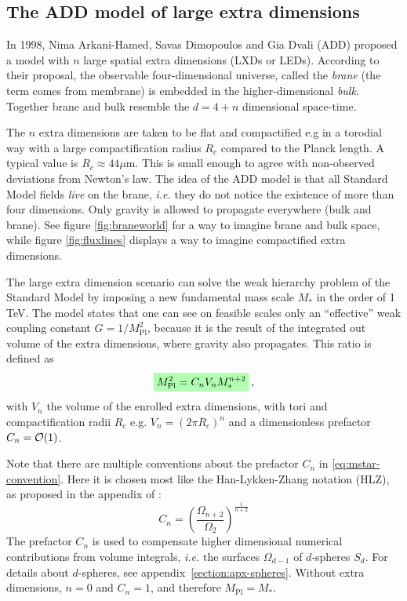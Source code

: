 \documentclass[12pt,a4paper]{report}
\numberwithin{equation}{chapter}
\newcommand{\highlight}[1]{%
  \colorbox{green!30}{$\displaystyle#1$}}
\begin{document}
\subsection{The ADD model of large extra dimensions}
In 1998, Nima Arkani-Hamed, Savas Dimopoulos and Gia Dvali (ADD) proposed a model with $n$ large spatial extra dimensions (LXDs or LEDs). According to their proposal, the observable four-dimensional universe, called the \emph{brane} (the term comes from membrane) is embedded in the higher-dimensional \emph{bulk}. Together brane and bulk resemble the $d=4+n$ dimensional space-time.

The $n$ extra dimensions are taken to be flat and compactified e.g in a torodial way with a large compactification radius $R_c$ compared to the Planck length. A typical value is $R_c \approx 44\mu$m. This is small enough to agree with non-observed deviations from Newton's law. The idea of the ADD model is that all Standard Model fields \emph{live} on the brane, \emph{i.e.} they do not notice the existence of more than four dimensions. Only gravity \cite{Kanti2004} is allowed to propagate everywhere (bulk and brane). See figure \ref{fig:braneworld} for a way to imagine brane and bulk space, while figure \ref{fig:fluxlines} displays a way to imagine compactified extra dimensions.


The large extra dimension scenario can solve the weak hierarchy problem of the Standard Model by imposing a new fundamental mass scale $M_*$ in the order of 1 TeV. The model states that one can see on feasible scales only an ``effective'' weak coupling constant $G=1/M_\text{Pl}^2$, because it is the result of the integrated out volume of the extra dimensions, where gravity also propagates. This ratio is defined as
\begin{equation}\label{eq:mstar-convention}
\highlight{
M_\text{Pl}^2 = C_n V_n M_*^{n+2}
}%
\,,
\end{equation}
with $V_n$ the volume of the enrolled extra dimensions, with tori and compactification radii $R_c$ e.g. $V_n=(2\pi R_c)^n$ and a dimensionless prefactor $C_n = {\cal O}(1)$.

Note that there are multiple conventions about the prefactor $C_n$ in \eqref{eq:mstar-convention}. Here it is chosen most like the Han-Lykken-Zhang notation (HLZ), as proposed in the appendix of \cite{cavaglia}:
\begin{equation}
C_n = \left(\frac{\Omega_{n+2}}{\Omega_2}\right)^\frac{1}{n+2}
\end{equation}
The prefactor $C_n$ is used to compensate higher dimensional numerical contributions from volume integrals, \emph{i.e.} the surfaces $\Omega_{d-1}$ of $d$-spheres $S_d$. For details about $d$-spheres, see appendix~\ref{section:apx-spheres}. Without extra dimensions, $n=0$ and $C_n=1$, and therefore $M_\text{Pl} = M_*$.
\end{document}
